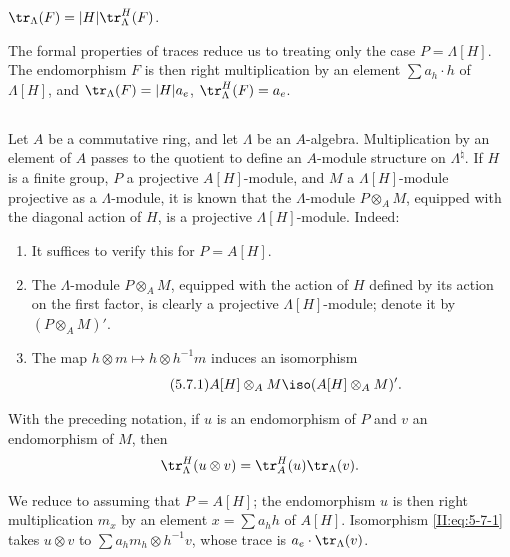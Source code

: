 \begin{proposition_}\label{II:5-6}
$\tr_\Lambda(F) = |H|\tr_\Lambda^H(F)$.
\end{proposition_}

The formal properties of traces reduce us to treating only the case
$P=\Lambda[H]$. The endomorphism $F$ is then right multiplication by an
element $\sum a_h\cdot h$ of $\Lambda[H]$, and
$\tr_\Lambda(F) = |H| a_e$, $\tr_\Lambda^H(F) = a_e$.






\subsection{}\label{II:5-7}

Let $A$ be a commutative ring, and let $\Lambda$ be an $A$-algebra.
Multiplication by an element of $A$ passes to the quotient to define an
$A$-module structure on $\Lambda^\natural$. If $H$ is a finite group, $P$ a
projective $A[H]$-module, and $M$ a $\Lambda[H]$-module projective as a
$\Lambda$-module, it is known that the $\Lambda$-module $P\otimes_A M$,
equipped with the diagonal action of $H$, is a projective
$\Lambda[H]$-module. Indeed:
\begin{enumerate}[\indent a)]
  \item It suffices to verify this for $P=A[H]$.
  \item The $\Lambda$-module $P\otimes_A M$, equipped with the action of $H$
    defined by its action on the first factor, is clearly a projective
    $\Lambda[H]$-module; denote it by $(P\otimes_A M)'$.
  \item The map $h\otimes m\mapsto h\otimes h^{-1} m$ induces an isomorphism
    \begin{equation*}\tag{5.7.1}\label{II:eq:5-7-1}
      A[H]\otimes_A M \iso (A[H]\otimes_A M)' \text{.}
    \end{equation*}
\end{enumerate}






\begin{proposition_}\label{II:5-8}
With the preceding notation, if $u$ is an endomorphism of $P$ and $v$ an
endomorphism of $M$, then
\[
  \tr_\Lambda^H(u\otimes v) = \tr_A^H(u)\tr_\Lambda(v) \text{.}
\]
\end{proposition_}

We reduce to assuming that $P=A[H]$; the endomorphism $u$ is then right
multiplication $m_x$ by an element $x=\sum a_h h$ of $A[H]$. Isomorphism
\eqref{II:eq:5-7-1} takes $u\otimes v$ to
$\sum a_h m_h\otimes h^{-1} v$, whose trace is
$a_e\cdot\tr_\Lambda(v)$.






